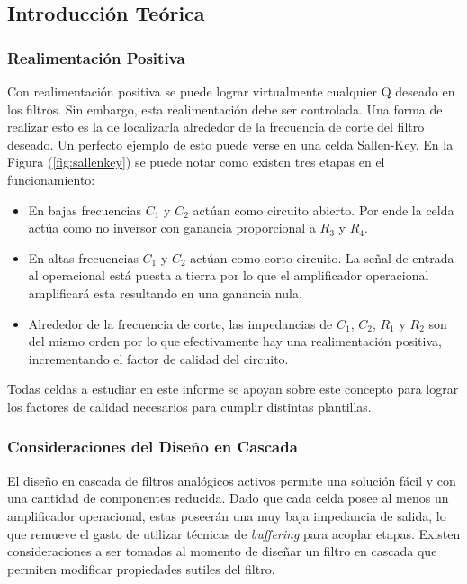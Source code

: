 \subsection{Introducción Teórica}

\subsubsection{Realimentación Positiva}

Con realimentación positiva se puede lograr virtualmente cualquier Q deseado en los filtros. Sin embargo, esta realimentación debe ser controlada. Una forma de realizar esto es la de localizarla alrededor de la frecuencia de corte del filtro deseado. Un perfecto ejemplo de esto puede verse en una celda Sallen-Key. En la Figura (\ref{fig:sallenkey}) se puede notar como existen tres etapas en el funcionamiento:

\begin{itemize}
\item En bajas frecuencias $C_1$ y $C_2$ actúan como circuito abierto. Por ende la celda actúa como no inversor con ganancia proporcional a $R_3$ y $R_4$. 
\item En altas frecuencias $C_1$ y $C_2$ actúan como corto-circuito. La señal de entrada al operacional está puesta a tierra por lo que el amplificador operacional amplificará esta resultando en una ganancia nula. 
\item Alrededor de la frecuencia de corte, las impedancias de $C_1$, $C_2$, $R_1$ y $R_2$ son del mismo orden por lo que efectivamente hay una realimentación positiva, incrementando el factor de calidad del circuito.
\end{itemize}

Todas celdas a estudiar en este informe se apoyan sobre este concepto para lograr los factores de calidad necesarios para cumplir distintas plantillas.

\subsubsection{Consideraciones del Diseño en Cascada}
El diseño en cascada de filtros analógicos activos permite una solución fácil y con una cantidad de componentes reducida. Dado que cada celda posee al menos un amplificador operacional, estas poseerán una muy baja impedancia de salida, lo que remueve el gasto de utilizar técnicas de \textit{buffering} para acoplar etapas. Existen consideraciones a ser tomadas al momento de diseñar un filtro en cascada que permiten modificar propiedades sutiles del filtro. 

